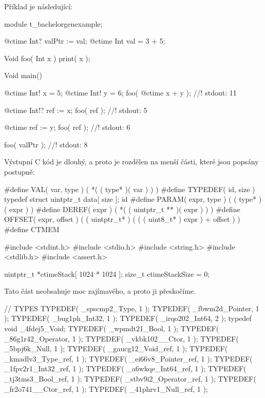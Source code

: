 Příklad je následující: \nopagebreak

\begin{code}[\label{impl:gencode:sample}]
module t_bachelorgenexample;

@ctime Int? valPtr := val;
@ctime Int val = 3 + 5;

Void foo( Int x ) {
	print( x );
}

Void main() {
	@ctime Int! x = 5;
	@ctime Int! y = 6;
	foo( @ctime x + y ); //! stdout: 11
	
	@ctime Int!? ref := x;
	foo( ref ); //! stdout: 5
	
	@ctime ref := y;
	foo( ref ); //! stdout: 6
	
	foo( valPtr ); //! stdout: 8
}
\end{code}

Výstupní C kód je dlouhý, a proto je rozdělen na menší části, které jsou popsány postupně:

\begin{cppcode}
#define VAL( var, type ) ( *( ( type* )( var ) ) )
#define TYPEDEF( id, size ) typedef struct { uintptr_t data[ size ]; } id
#define PARAM( expr, type ) ( ( type* )( expr ) )
#define DEREF( expr ) ( *( ( uintptr_t ** )( expr ) ) )
#define OFFSET( expr, offset ) ( ( uintptr_t* ) ( ( ( uint8_t* ) expr ) + offset ) )
#define CTMEM

#include <stdint.h>
#include <stdio.h>
#include <string.h>
#include <stdlib.h>
#include <assert.h>

uintptr_t *ctimeStack[ 1024 * 1024 ];
size_t ctimeStackSize = 0;
\end{cppcode}

Tato část neobsahuje moc zajímavého, a proto ji přeskočíme.

\begin{cppcode}
// TYPES
TYPEDEF( _spscmp2_Type, 1 );
TYPEDEF( _fbwm2d_Pointer, 1 );
TYPEDEF( _bug1ph_Int32, 1 );
TYPEDEF( _irqo202_Int64, 2 );
typedef void _4fdej5_Void;
TYPEDEF( _wpmdt21_Bool, 1 );
TYPEDEF( _86g1r42_Operator, 1 );
TYPEDEF( _vkbk102__Ctor, 1 );
TYPEDEF( _5bpj6k_Null, 1 );
TYPEDEF( _gaucg12_Void_ref, 1 );
TYPEDEF( _kmadlv3_Type_ref, 1 );
TYPEDEF( _ei66v8_Pointer_ref, 1 );
TYPEDEF( _1fpv2r1_Int32_ref, 1 );
TYPEDEF( _a6wkqe_Int64_ref, 1 );
TYPEDEF( _tj3tms3_Bool_ref, 1 );
TYPEDEF( _stbv9i2_Operator_ref, 1 );
TYPEDEF( _fr2o741__Ctor_ref, 1 );
TYPEDEF( _41phrv1_Null_ref, 1 );
\end{cppcode}

